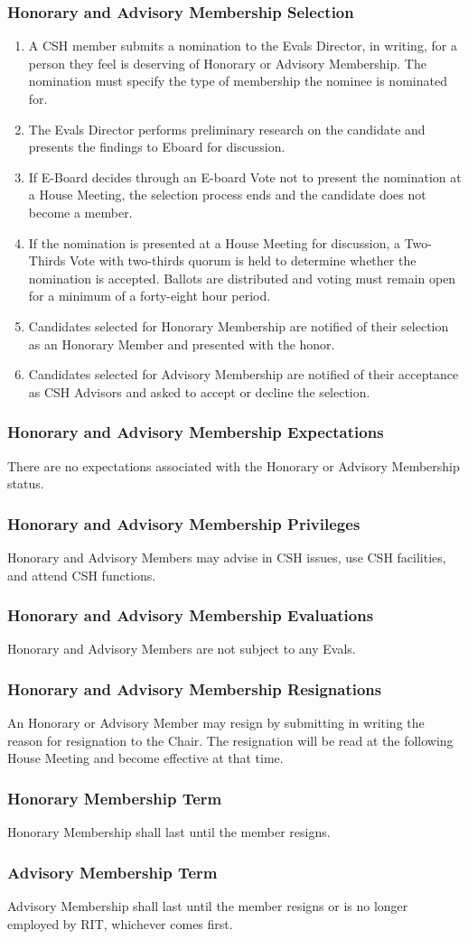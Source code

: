 \documentclass{article}
\newcommand{\asubsection}[1]{\subsubsection{#1} \label{#1}}
\begin{document}
\asubsection{Honorary and Advisory Membership Selection}
\begin{enumerate}
	\item A CSH member submits a nomination to the Evals Director, in writing, for a person they feel is deserving of Honorary or Advisory Membership. The nomination must specify the type of membership the nominee is nominated for.
	\item The Evals Director performs preliminary research on the candidate and presents the findings to Eboard for discussion.
	\item If E-Board decides through an E-board Vote not to present the nomination at a House Meeting, the selection process ends and the candidate does not become a member.
	\item If the nomination is presented at a House Meeting for discussion, a Two-Thirds Vote with two-thirds quorum is held to determine whether the nomination is accepted.
	      Ballots are distributed and voting must remain open for a minimum of a forty-eight hour period.
	\item Candidates selected for Honorary Membership are notified of their selection as an Honorary Member and presented with the honor.
	\item Candidates selected for Advisory Membership are notified of their acceptance as CSH Advisors and asked to accept or decline the selection.
\end{enumerate}

\asubsection{Honorary and Advisory Membership Expectations}
There are no expectations associated with the Honorary or Advisory Membership status.

\asubsection{Honorary and Advisory Membership Privileges}
Honorary and Advisory Members may advise in CSH issues, use CSH facilities, and attend CSH functions.

\asubsection{Honorary and Advisory Membership Evaluations}
Honorary and Advisory Members are not subject to any Evals.

\asubsection{Honorary and Advisory Membership Resignations}
An Honorary or Advisory Member may resign by submitting in writing the reason for resignation to the Chair.
The resignation will be read at the following House Meeting and become effective at that time.

\asubsection{Honorary Membership Term}
Honorary Membership shall last until the member resigns.

\asubsection{Advisory Membership Term}
Advisory Membership shall last until the member resigns or is no longer employed by RIT, whichever comes first.
\end{document}
